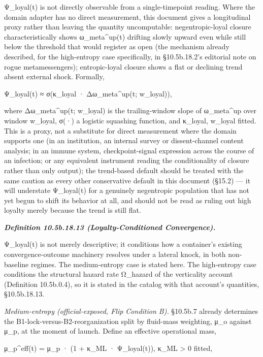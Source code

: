 \documentclass[
]{article}
\begin{document}
Ψ\_loyal(t) is not directly observable from a single-timepoint reading.
Where the domain adapter has no direct measurement, this document gives
a longitudinal proxy rather than leaving the quantity uncomputable:
negentropic-loyal closure characteristically shows ω\_meta\^{}up(t)
drifting slowly upward even while still below the threshold that would
register as open (the mechanism already described, for the high-entropy
case specifically, in §10.5b.18.2's editorial note on rogue
metamessengers); entropic-loyal closure shows a flat or declining trend
absent external shock. Formally,

Ψ\_loyal(t) ≈ σ(κ\_loyal · Δω\_meta\^{}up(t; w\_loyal)),

where Δω\_meta\^{}up(t; w\_loyal) is the trailing-window slope of
ω\_meta\^{}up over window w\_loyal, σ(·) a logistic squashing function,
and κ\_loyal, w\_loyal fitted. This is a proxy, not a substitute for
direct measurement where the domain supports one (in an institution, an
internal survey or dissent-channel content analysis; in an immune
system, checkpoint-signal expression across the course of an infection;
or any equivalent instrument reading the conditionality of closure
rather than only output); the trend-based default should be treated with
the same caution as every other conservative default in this document
(§15.2) --- it will understate Ψ\_loyal(t) for a genuinely negentropic
population that has not yet begun to shift its behavior at all, and
should not be read as ruling out high loyalty merely because the trend
is still flat.

\emph{\textbf{Definition 10.5b.18.13 (Loyalty-Conditioned
Convergence).}}

Ψ\_loyal(t) is not merely descriptive; it conditions how a container's
existing convergence-outcome machinery resolves under a lateral knock,
in both non-baseline regimes. The medium-entropy case is stated here.
The high-entropy case conditions the structural hazard rate Ω\_hazard of
the verticality account (Definition 10.5b.0.4), so it is stated in the
catalog with that account's quantities, §10.5b.18.13.

\emph{Medium-entropy (official-exposed, Flip Condition B).} §10.5b.7
already determines the B1-lock-versus-B2-reorganization split by
fluid-mass weighting, μ\_o against μ\_p, at the moment of launch. Define
an effective operational mass,

μ\_p\^{}eff(t) = μ\_p · (1 + κ\_ML · Ψ\_loyal(t)), κ\_ML \textgreater{}
0 fitted,
\end{document}
